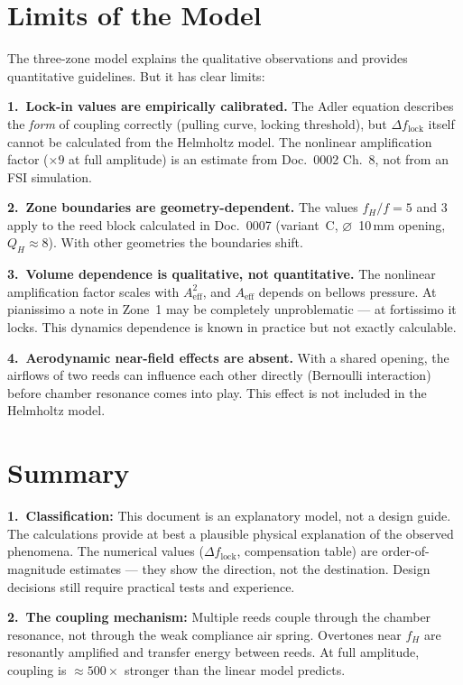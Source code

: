 \documentclass[11pt,a4paper]{article}
\begin{document}
\section{Limits of the Model}

The three-zone model explains the qualitative observations and provides quantitative guidelines. But it has clear limits:

\textbf{1.\ Lock-in values are empirically calibrated.} The Adler equation describes the \textit{form} of coupling correctly (pulling curve, locking threshold), but $\Delta f_\text{lock}$ itself cannot be calculated from the Helmholtz model. The nonlinear amplification factor ($\times 9$ at full amplitude) is an estimate from Doc.~0002 Ch.~8, not from an FSI simulation.

\textbf{2.\ Zone boundaries are geometry-dependent.} The values $f_H/f = 5$ and $3$ apply to the reed block calculated in Doc.~0007 (variant~C, $\varnothing$~10\,mm opening, $Q_H \approx 8$). With other geometries the boundaries shift.

\textbf{3.\ Volume dependence is qualitative, not quantitative.} The nonlinear amplification factor scales with $A_\text{eff}^2$, and $A_\text{eff}$ depends on bellows pressure. At pianissimo a note in Zone~1 may be completely unproblematic --- at fortissimo it locks. This dynamics dependence is known in practice but not exactly calculable.

\textbf{4.\ Aerodynamic near-field effects are absent.} With a shared opening, the airflows of two reeds can influence each other directly (Bernoulli interaction) before chamber resonance comes into play. This effect is not included in the Helmholtz model.

\section{Summary}

\begin{warnbox}
\textbf{1.\ Classification:} This document is an explanatory model, not a design guide. The calculations provide at best a plausible physical explanation of the observed phenomena. The numerical values ($\Delta f_\text{lock}$, compensation table) are order-of-magnitude estimates --- they show the direction, not the destination. Design decisions still require practical tests and experience.
\end{warnbox}

\begin{keybox}
\textbf{2.\ The coupling mechanism:} Multiple reeds couple through the chamber resonance, not through the weak compliance air spring. Overtones near $f_H$ are resonantly amplified and transfer energy between reeds. At full amplitude, coupling is $\approx 500\times$ stronger than the linear model predicts.
\end{keybox}
\end{document}
